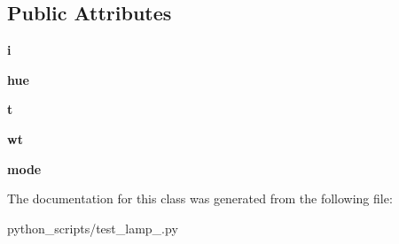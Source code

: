 \subsection*{Public Attributes}
\begin{DoxyCompactItemize}
\item 
\hypertarget{classtest__lamp__2_1_1LED_a41c87b79c37a76cf50c4c0953289155e}{}{\bfseries i}\label{classtest__lamp__2_1_1LED_a41c87b79c37a76cf50c4c0953289155e}

\item 
\hypertarget{classtest__lamp__2_1_1LED_afb5082c08e48f00994c392fa217d2b09}{}{\bfseries hue}\label{classtest__lamp__2_1_1LED_afb5082c08e48f00994c392fa217d2b09}

\item 
\hypertarget{classtest__lamp__2_1_1LED_ac6f3c82e200c02b156c2784e226fa5dd}{}{\bfseries t}\label{classtest__lamp__2_1_1LED_ac6f3c82e200c02b156c2784e226fa5dd}

\item 
\hypertarget{classtest__lamp__2_1_1LED_a0e412e0c696e67f761031607303d5d06}{}{\bfseries wt}\label{classtest__lamp__2_1_1LED_a0e412e0c696e67f761031607303d5d06}

\item 
\hypertarget{classtest__lamp__2_1_1LED_a0db3ed45d4456ca7df9194ebebbb0ee5}{}{\bfseries mode}\label{classtest__lamp__2_1_1LED_a0db3ed45d4456ca7df9194ebebbb0ee5}

\end{DoxyCompactItemize}


The documentation for this class was generated from the following file\+:\begin{DoxyCompactItemize}
\item 
python\+\_\+scripts/test\+\_\+lamp\+\_.\+py\end{DoxyCompactItemize}
